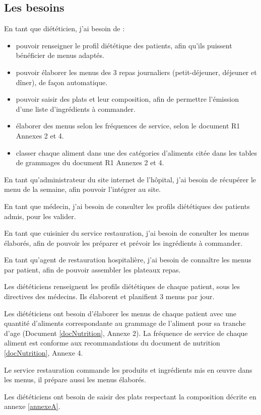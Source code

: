 \subsection{Les besoins}
En tant que diététicien, j’ai besoin de :
\begin{itemize}
 \item pouvoir renseigner le profil diététique des patients, afin qu’ils puissent bénéficier de menus adaptés.
 \item pouvoir élaborer les menus des 3 repas journaliers (petit-déjeuner, déjeuner et dîner), de façon automatique.
 \item pouvoir saisir des plats et leur composition, afin de permettre l’émission d’une liste d’ingrédients à commander.
 \item élaborer des menus selon les fréquences de service, selon le document R1 Annexes 2 et 4.
 \item classer chaque aliment dans une des catégories d’aliments citée dans les tables de grammages du document R1 Annexes 2 et 4.
\end{itemize}
En tant qu’administrateur du site internet de l’hôpital, j’ai besoin de récupérer le menu de la semaine, afin pouvoir l’intégrer au site.

En tant que médecin, j’ai besoin de consulter les profils diététiques des patients admis, pour les  valider.

En tant que cuisinier du service restauration, j’ai besoin de consulter les menus élaborés, afin de pouvoir les préparer et prévoir les ingrédients à commander.

En tant qu’agent de restauration hospitalière,  j’ai besoin de connaître les menus par patient, afin de pouvoir assembler les plateaux repas.

Les diététiciens renseignent les profils diététiques de chaque patient, sous les directives des médecins. Ils élaborent et planifient 3 menus par jour.

Les diététiciens ont besoin d'élaborer les menus de chaque patient avec une quantité d'aliments correspondante au grammage de l'aliment pour sa tranche d'age (Document \ref{docNutrition}, Annexe 2). La fréquence de service de chaque aliment est conforme aux recommandations du document de nutrition \ref{docNutrition}, Annexe 4.

Le service restauration commande les produits et ingrédients mis en œuvre dans les menus, il prépare aussi les menus élaborés.

Les diététiciens ont besoin de saisir des plats respectant la composition décrite en annexe \ref{annexeA}.

